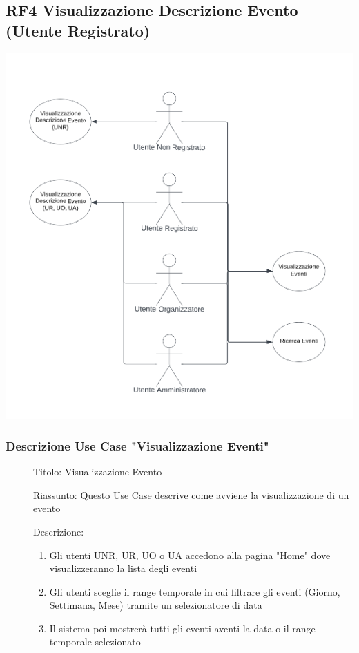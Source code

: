 \documentclass{article}
\begin{document}
\subsection{RF4 Visualizzazione Descrizione Evento (Utente Registrato)}
\begin{center}
    \item[] \includegraphics[scale=0.7]{UseCase_1.png}
\end{center}
\subsubsection*{Descrizione Use Case "Visualizzazione Eventi"}
\begin{description}
    \item[] Titolo: Visualizzazione Evento
    \item[] Riassunto: Questo Use Case descrive come avviene la visualizzazione di un evento
    \item[] Descrizione:
        \begin{enumerate}
            \item Gli utenti UNR, UR, UO o UA accedono alla pagina "Home" dove visualizzeranno la lista degli eventi
            \item Gli utenti sceglie il range temporale in cui filtrare gli eventi (Giorno, Settimana, Mese) tramite un selezionatore di data
            \item Il sistema poi mostrerà tutti gli eventi aventi la data o il range temporale selezionato
        \end{enumerate}
\end{description}
\end{document}
